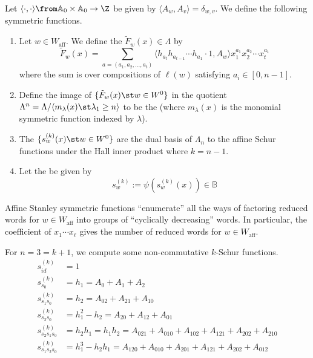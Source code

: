 \documentclass[11pt,leqno,oneside]{amsart}
\numberwithin{thm}{section}
\renewcommand{\W}{W}
\newcommand{\Waff}{\W_{\text{aff}}}
\newcommand{\A}{\mathbb{A}}
\newcommand{\B}{\mathbb{B}}
\newcommand{\sym}{\Lambda}
\begin{document}
\begin{defn}\label{k-schur-def-1}
  Let \(\langle \cdot, \cdot \rangle \from \A_0 \times \A_0 \to
    \Z\) be given by \(\langle A_w, A_v \rangle = \delta_{w,v}\). We
    define the following symmetric functions.
  \begin{enumerate}
  \item Let \(w \in \Waff\). We define the  \(\tilde{F}_w(x) \in \sym\) by
    \[ \tilde{F}_w(x) = \sum_{a = (a_1, a_2, \ldots, a_t)} \langle
      h_{a_t} h_{a_{t-1}} \cdots h_{a_1} \cdot 1, A_w \rangle
      x_1^{a_1} x_2^{a_2} \cdots x_t^{a_t}
    \]
    where the sum is over compositions of \(\ell(w)\) satisfying
    \(a_i \in [0,n-1]\).
  \item Define the image of \(\{\tilde{F}_w(x) \st w \in \W^0\}\) in
    the quotient \(\sym^n = \sym/\langle m_\lambda(x) \st
    \lambda_1 \geq n\rangle\) to be the 
    (where \(m_\lambda(x)\) is the monomial symmetric function indexed
    by \(\lambda\)).
  \item The  \(\{s_w^{(k)}(x) \st w \in \W^0\}\)
  are the dual basis of \(\sym_n\) to the affine Schur functions under
  the Hall inner product where \(k = n-1\).
  \item Let the  be given
    by \[
      s_w^{(k)} := \psi(s_w^{(k)}(x)) \in \B
    \]
  \end{enumerate}
\end{defn}
\begin{rmk}
  Affine Stanley symmetric functions ``enumerate'' all the ways of
  factoring reduced words for \(w \in \Waff\) into groups of
  ``cyclically decreasing'' words. In particular, the coefficient of \(x_1
  \cdots x_\ell\) gives the number of reduced words for \(w \in \Waff\).
\end{rmk}
\begin{example}
  For \(n=3=k+1\), we compute some non-commutative \(k\)-Schur functions.
  \begin{align*}
    s_{id}^{(k)} & = 1 \\
    s_{s_0}^{(k)} & = h_1 = A_0+A_1+A_2 \\
    s_{s_1 s_0}^{(k)} & = h_2 = A_{02}+A_{21}+A_{10}\\
    s_{s_2 s_0}^{(k)} & = h_1^2-h_2=A_{20}+A_{12}+A_{01}\\
    s_{s_2 s_1 s_0}^{(k)} & = h_2h_1 = h_1 h_2 = A_{021}+A_{010}+A_{102}+A_{121}+A_{202}+A_{210}\\
    s_{s_1 s_2 s_0}^{(k)} & = h_1^3-h_2 h_1 = A_{120}+A_{010}+A_{201}+A_{121}+A_{202}+A_{012}
  \end{align*}
\end{example}
\end{document}
